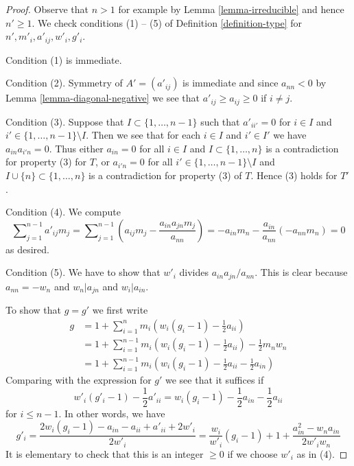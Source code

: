 \documentclass[10pt,a4paper]{amsart}
\theoremstyle{plain}
\theoremstyle{definition}
\theoremstyle{remark}
\numberwithin{equation}{subsection}
\begin{document}
\begin{proof}
Observe that $n > 1$ for example by Lemma \ref{lemma-irreducible}
and hence $n' \geq 1$. We check conditions (1) -- (5) of
Definition \ref{definition-type} for $n', m'_i, a'_{ij}, w'_i, g'_i$.

\medskip\noindent
Condition (1) is immediate.

\medskip\noindent
Condition (2). Symmetry of $A' = (a'_{ij})$ is immediate
and since $a_{nn} < 0$ by Lemma \ref{lemma-diagonal-negative}
we see that $a'_{ij} \geq a_{ij} \geq 0$ if $i \not = j$.

\medskip\noindent
Condition (3). Suppose that $I \subset \{1, \ldots, n - 1\}$ such that
$a'_{ii'} = 0$ for $i \in I$ and $i' \in \{1, \ldots, n - 1\} \setminus I$.
Then we see that for each $i \in I$ and $i' \in I'$ we have
$a_{in}a_{i'n} = 0$. Thus either $a_{in} = 0$ for all $i \in I$ and
$I \subset \{1, \ldots, n\}$ is a contradiction for property (3) for $T$,
or $a_{i'n} = 0$ for all $i' \in \{1, \ldots, n - 1\} \setminus I$
and $I \cup \{n\} \subset \{1, \ldots, n\}$ is a contradiction for
property (3) of $T$. Hence (3) holds for $T'$.

\medskip\noindent
Condition (4). We compute
$$
\sum\nolimits_{j = 1}^{n - 1} a'_{ij}m_j =
\sum\nolimits_{j = 1}^{n - 1}
(a_{ij}m_j - \frac{a_{in}a_{jn}m_j}{a_{nn}}) =
- a_{in}m_n - \frac{a_{in}}{a_{nn}}(-a_{nn}m_n) = 0
$$
as desired.

\medskip\noindent
Condition (5). We have to show that $w'_i$ divides $a_{in}a_{jn}/a_{nn}$.
This is clear because $a_{nn} = -w_n$ and $w_n | a_{jn}$ and $w_i | a_{in}$.

\medskip\noindent
To show that $g = g'$ we first write
\begin{align*}
g
& =
1 + \sum\nolimits_{i = 1}^n m_i(w_i(g_i - 1) - \frac{1}{2}a_{ii}) \\
& =
1 + \sum\nolimits_{i = 1}^{n - 1} m_i(w_i(g_i - 1) - \frac{1}{2}a_{ii})
-\frac{1}{2}m_nw_n \\
& =
1 +  \sum\nolimits_{i = 1}^{n - 1}
m_i(w_i(g_i - 1) - \frac{1}{2}a_{ii} - \frac{1}{2}a_{in})
\end{align*}
Comparing with the expression for $g'$ we see that it suffices if
$$
w'_i(g'_i - 1) - \frac{1}{2}a'_{ii} =
w_i(g_i - 1) - \frac{1}{2}a_{in} - \frac{1}{2}a_{ii}
$$
for $i \leq n - 1$. In other words, we have
$$
g'_i = \frac{2w_i(g_i - 1) - a_{in} - a_{ii} + a'_{ii} + 2w'_i}{2w'_i} =
\frac{w_i}{w'_i}(g_i - 1) + 1 + \frac{a_{in}^2 - w_na_{in}}{2w'_iw_n}
$$
It is elementary to check that this is an integer $\geq 0$
if we choose $w'_i$ as in (4).
\end{proof}
\end{document}
